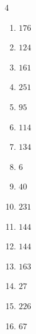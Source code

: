 \begin{multicols}{4}
\begin{enumerate}
  \item $176$


  \item $124$


  \item $161$


  \item $251$


  \item $95$


  \item $114$


  \item $134$


  \item $6$


  \item $40$


  \item $231$


  \item $144$


  \item $144$


  \item $163$


  \item $27$


\columnbreak %

  \item $226$


  \item $67$


\end{enumerate}
\end{multicols}
